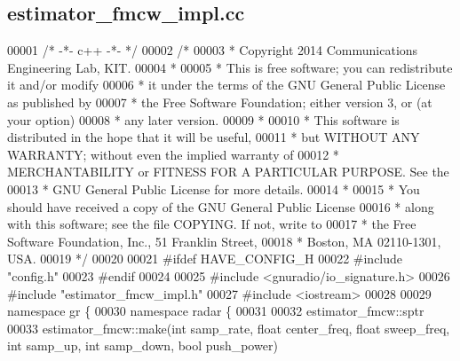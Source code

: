 \subsection{estimator\+\_\+fmcw\+\_\+impl.\+cc}
\label{estimator__fmcw__impl_8cc_source}

\begin{DoxyCode}
00001 \textcolor{comment}{/* -*- c++ -*- */}
00002 \textcolor{comment}{/* }
00003 \textcolor{comment}{ * Copyright 2014 Communications Engineering Lab, KIT.}
00004 \textcolor{comment}{ * }
00005 \textcolor{comment}{ * This is free software; you can redistribute it and/or modify}
00006 \textcolor{comment}{ * it under the terms of the GNU General Public License as published by}
00007 \textcolor{comment}{ * the Free Software Foundation; either version 3, or (at your option)}
00008 \textcolor{comment}{ * any later version.}
00009 \textcolor{comment}{ * }
00010 \textcolor{comment}{ * This software is distributed in the hope that it will be useful,}
00011 \textcolor{comment}{ * but WITHOUT ANY WARRANTY; without even the implied warranty of}
00012 \textcolor{comment}{ * MERCHANTABILITY or FITNESS FOR A PARTICULAR PURPOSE.  See the}
00013 \textcolor{comment}{ * GNU General Public License for more details.}
00014 \textcolor{comment}{ * }
00015 \textcolor{comment}{ * You should have received a copy of the GNU General Public License}
00016 \textcolor{comment}{ * along with this software; see the file COPYING.  If not, write to}
00017 \textcolor{comment}{ * the Free Software Foundation, Inc., 51 Franklin Street,}
00018 \textcolor{comment}{ * Boston, MA 02110-1301, USA.}
00019 \textcolor{comment}{ */}
00020  
00021 \textcolor{preprocessor}{#ifdef HAVE\_CONFIG\_H}
00022 \textcolor{preprocessor}{#include "config.h"}
00023 \textcolor{preprocessor}{#endif}
00024 
00025 \textcolor{preprocessor}{#include <gnuradio/io\_signature.h>}
00026 \textcolor{preprocessor}{#include "estimator_fmcw_impl.h"}
00027 \textcolor{preprocessor}{#include <iostream>}
00028 
00029 \textcolor{keyword}{namespace }gr \{
00030   \textcolor{keyword}{namespace }radar \{
00031 
00032     estimator_fmcw::sptr
00033     estimator_fmcw::make(\textcolor{keywordtype}{int} samp_rate, \textcolor{keywordtype}{float} center_freq, \textcolor{keywordtype}{float} sweep_freq, \textcolor{keywordtype}{int} 
      samp_up, \textcolor{keywordtype}{int} samp_down, \textcolor{keywordtype}{bool} push\_power)

\end{DoxyCode}
